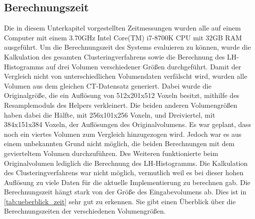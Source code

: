 \subsection{Berechnungszeit}

Die in diesem Unterkapitel vorgestellten Zeitmessungen wurden alle auf einem Computer mit einem 3.70GHz  Intel Core(TM) i7-8700K CPU mit 32GB RAM ausgeführt.
Um die Berechnungszeit des Systems evaluieren zu können, wurde die Kalkulation des gesamten Clusteringverfahrens sowie die Berechnung des LH-Histogramms auf drei Volumen verschiedener Größen durchgeführt. Damit der Vergleich nicht von unterschiedlichen Volumendaten verfälscht wird, wurden alle Volumen aus dem gleichen CT-Datensatz generiert.
\newline
Dabei wurde die Originalgröße, die ein Auflösung von 512x201x512 Voxeln besitzt, mithilfe des Resamplemoduls des Helpers verkleinert. Die beiden anderen Volumengrößen haben dabei die  Hälfte, mit 256x101x256 Voxeln, und Dreiviertel, mit 384x151x384 Voxeln, der Auflösungen des Originalvolumens.
Es war geplant, dass noch ein viertes Volumen zum Vergleich hinzugezogen wird. Jedoch war es aus einem unbekannten Grund nicht möglich, die beiden Berechnungen mit dem gevierteltem Volumen durchzuführen.
Des Weiteren funktionierte beim Originalvolumen lediglich die Berechnung des LH-Histogramms. Die Kalkulation des Clusteringverfahrens war nicht möglich, vermutlich weil es bei dieser hohen Auflösung zu viele Daten für die aktuelle Implementierung zu berechnen gab.
Die Berechnungszeit hängt stark von der Größe des Eingabevolumens ab. Dies ist in \autoref{tab:ueberblick_zeit} sehr gut zu erkennen. Sie gibt einen Überblick über die  Berechnungszeiten der verschiedenen Volumengrößen.


\begin{table}[h]
\centering
{}
\caption{Überblick über die Berechnungszeiten der verschiedenen Volumengrößen}
\label{tab:ueberblick_zeit}
\end{table}


